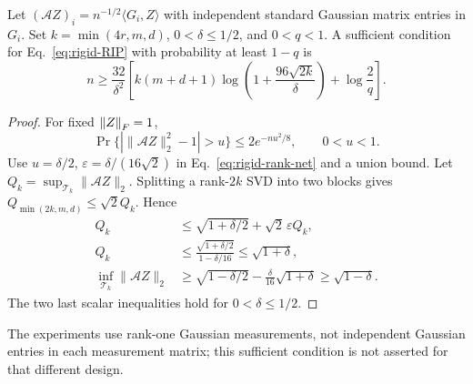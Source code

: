 \begin{theorem}
Let $(\mathcal AZ)_i=n^{-1/2}\langle G_i,Z\rangle$ with independent
standard Gaussian matrix entries in $G_i$. Set
$k=\min(4r,m,d)$, $0<\delta\leq1/2$, and $0<q<1$.
A sufficient condition for Eq.~\eqref{eq:rigid-RIP} with probability
at least $1-q$ is
\begin{equation}
n\geq\frac{32}{\delta^2}
\left[
k(m+d+1)\log\!\left(1+\frac{96\sqrt{2k}}{\delta}\right)
+\log\frac2q
\right].
\label{eq:rigid-gaussian-sample-size}
\end{equation}
\end{theorem}
\begin{proof}
For fixed $\left\lVert Z\right\rVert_F=1$,
\begin{equation}
\Pr\{|\|\mathcal AZ\|_2^2-1|>u\}
\leq2e^{-nu^2/8},\qquad0<u<1 .
\end{equation}
Use $u=\delta/2$, $\varepsilon=\delta/(16\sqrt2)$ in
Eq.~\eqref{eq:rigid-rank-net} and a union bound.
Let $Q_k=\sup_{\mathcal T_k}\|\mathcal AZ\|_2$.
Splitting a rank-$2k$ SVD into two blocks gives
$Q_{\min(2k,m,d)}\leq\sqrt2 Q_k$. Hence
\begin{align}
Q_k&\leq\sqrt{1+\delta/2}+\sqrt2\,\varepsilon Q_k,\\
Q_k&\leq\frac{\sqrt{1+\delta/2}}{1-\delta/16}\leq\sqrt{1+\delta},\\
\inf_{\mathcal T_k}\|\mathcal AZ\|_2
&\geq\sqrt{1-\delta/2}
-\frac{\delta}{16}\sqrt{1+\delta}\geq\sqrt{1-\delta}.
\end{align}
The two last scalar inequalities hold for $0<\delta\leq1/2$.
\end{proof}
The experiments use rank-one Gaussian measurements, not independent
Gaussian entries in each measurement matrix; this sufficient condition
is not asserted for that different design.

